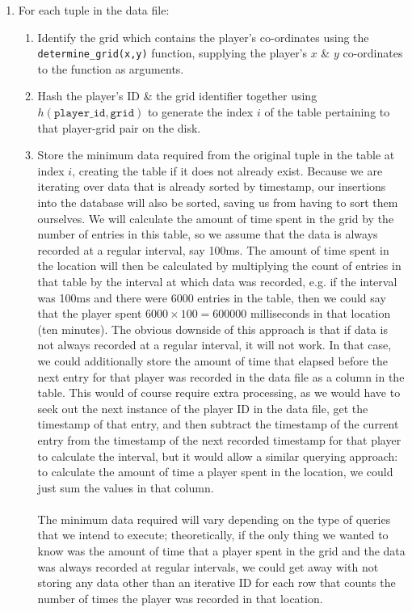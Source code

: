 \documentclass[a4paper,11pt]{article}
\begin{document}
\begin{enumerate}
    \item   For each tuple in the data file:
            \begin{enumerate}
                \item   Identify the grid which contains the player's co-ordinates using the \texttt{determine_grid(x,y)} function, supplying the player's $x$ \& $y$ co-ordinates to the function as arguments.
                \item   Hash the player's ID \& the grid identifier together using $h(\texttt{player\_id}, \texttt{grid})$ to generate the index $i$ of the table pertaining to that player-grid pair on the disk. 
                \item   Store the minimum data required from the original tuple in the table at index $i$, creating the table if it does not already exist. 
                        Because we are iterating over data that is already sorted by timestamp, our insertions into the database will also be sorted, saving us from having to sort them ourselves.   
                        We will calculate the amount of time spent in the grid by the number of entries in this table, so we assume that the data is always recorded at a regular interval, say 100ms. 
                        The amount of time spent in the location will then be calculated by multiplying the count of entries in that table by the interval at which data was recorded, e.g. if the interval was 100ms and there were 6000 entries in the table, then we could say that the player spent $6000 \times 100 = 600000$ milliseconds in that location (ten minutes).
                        The obvious downside of this approach is that if data is not always recorded at a regular interval, it will not work. 
                        In that case, we could additionally store the amount of time that elapsed before the next entry for that player was recorded in the data file as a column in the table. 
                        This would of course require extra processing, as we would have to seek out the next instance of the player ID in the data file, get the timestamp of that entry, and then subtract the timestamp of the current entry from the timestamp of the next recorded timestamp for that player to calculate the interval, but it would allow a similar querying approach: to calculate the amount of time a player spent in the location, we could just sum the values in that column.
                        \\\\
                        The minimum data required will vary depending on the type of queries that we intend to execute; theoretically, if the only thing we wanted to know was the amount of time that a player spent in the grid and the data was always recorded at regular intervals, we could get away with not storing any data other than an iterative ID for each row that counts the number of times the player was recorded in that location. 

\end{enumerate}
\end{enumerate}
\end{document}
